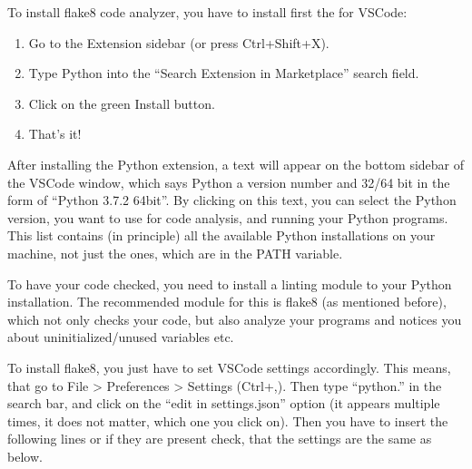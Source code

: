 \documentclass[letterpaper,10pt,english]{sphinxmanual}
\begin{document}
To install flake8 code analyzer, you have to install first the  for VSCode:
\begin{enumerate}
%
\item {} 
Go to the Extension sidebar (or press Ctrl+Shift+X).

\item {} 
Type Python into the “Search Extension in Marketplace” search field.

\item {} 
Click on the green Install button.

\item {} 
That’s it!

\end{enumerate}

After installing the Python extension, a text will appear on the bottom sidebar of the VSCode window, which says Python a version number and 32/64 bit in the form of “Python 3.7.2 64\sphinxhyphen{}bit”. By clicking on this text, you can select the Python version, you want to use for code analysis, and running your Python programs. This list contains (in principle) all the available Python installations on your machine, not just the ones, which are in the PATH variable.

To have your code checked, you need to install a linting module to your Python installation. The recommended module for this is flake8 (as mentioned before), which not only checks your code, but also analyze your programs and notices you about uninitialized/unused variables etc.

To install flake8, you just have to set VSCode settings accordingly. This means, that go to File \textendash{}\textgreater{} Preferences \textendash{}\textgreater{} Settings (Ctrl+,). Then type “python.” in the search bar, and click on the “edit in settings.json” option (it appears multiple times, it does not matter, which one you click on). Then you have to insert the following lines or \sphinxhyphen{} if they are present \sphinxhyphen{} check, that the settings are the same as below.

\begin{sphinxVerbatim}[commandchars=\\\{\}]
     
     
     
     \PYG{p}{[}
    \PYG{p}{]}
\end{sphinxVerbatim}
\end{document}

